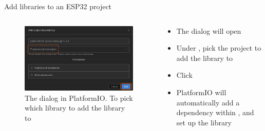 \documentclass[aspectratio=169]{beamer}
\begin{document}
\begin{frame}{Add libraries to an ESP32 project}
\begin{columns}
	\begin{column}{0.5\textwidth}
		\begin{figure}
  			\includegraphics[width=\textwidth,keepaspectratio=true]{assets/pictures/pio-libraries-3.png}
  			\caption{The  dialog in PlatformIO. To pick which library to add the library to}
  			\label{fig:pio-libraries-3}
		\end{figure}
	\end{column}
	\begin{column}{0.5\textwidth}
		\begin{textBox}
			\begin{itemize}
				\item The  dialog will open
				\item Under , pick the project to add the library to
				\item Click 
				\item PlatformIO will automatically add a  dependency within , and set up the library
			\end{itemize}
		\end{textBox}
	\end{column}
\end{columns}
\end{frame}
\end{document}
